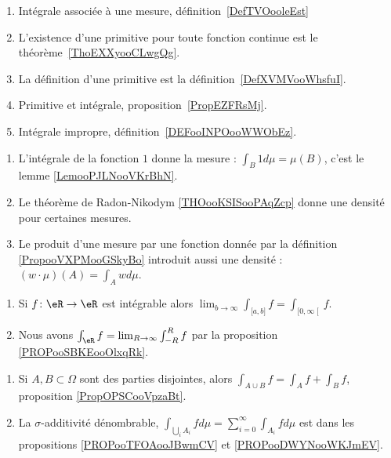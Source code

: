\begin{description}
		\begin{enumerate}
			\item
			      Intégrale associée à une mesure, définition~\ref{DefTVOooleEst}
			\item
			      L'existence d'une primitive pour toute fonction continue est le théorème~\ref{ThoEXXyooCLwgQg}.
			\item
			      La définition d'une primitive est la définition~\ref{DefXVMVooWhsfuI}.
			\item
			      Primitive et intégrale, proposition~\ref{PropEZFRsMj}.
			\item
			      Intégrale impropre, définition~\ref{DEFooINPOooWWObEz}.
		\end{enumerate}
	\item[Intégrale et mesure]
		\begin{enumerate}
			\item
			      L'intégrale de la fonction \( 1\) donne la mesure : \( \int_B1d\mu=\mu(B)\), c'est le lemme \ref{LemooPJLNooVKrBhN}.
			\item
			      Le théorème de Radon-Nikodym \ref{THOooKSISooPAqZcp} donne une densité pour certaines mesures.
			\item
			      Le produit d'une mesure par une fonction donnée par la définition \ref{PropooVXPMooGSkyBo} introduit aussi une densité : \( (w\cdot \mu)(A)=\int_Awd\mu\).
		\end{enumerate}

	\item[Limite dans les bornes]
		\begin{enumerate}
			\item
			      Si \(f \colon \eR\to \eR  \) est intégrable alors \(  \lim_{b \to\infty}\int_{\mathopen[ a,b\mathclose]}f=\int_{\mathopen[ 0,\infty\mathclose[}f\).
			\item
			      Nous avons \( \int_{\eR}f=\lim_{R\to \infty}\int_{-R}^Rf\) par la proposition \ref{PROPooSBKEooOlxqRk}.
		\end{enumerate}

	\item[Autre résultats]
		\begin{enumerate}
			\item
			      Si \( A,B\subset \Omega\) sont des parties disjointes, alors \( \int_{A\cup B}f=\int_Af+\int_Bf\), proposition \ref{PropOPSCooVpzaBt}.
			\item
			      La \( \sigma\)-additivité dénombrable, \( \int_{\bigcup_iA_i}fd\mu=\sum_{i=0}^{\infty}\int_{A_i}fd\mu\) est dans les propositions \ref{PROPooTFOAooJBwmCV} et \ref{PROPooDWYNooWKJmEV}.
		\end{enumerate}
\end{description}

